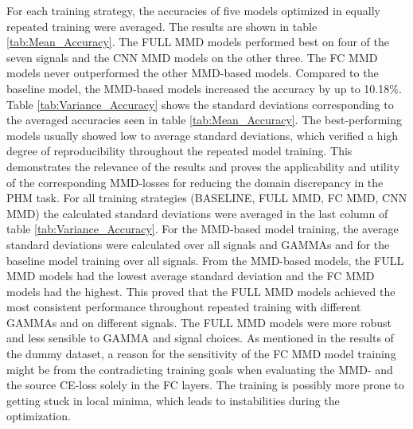 For each training strategy, the accuracies of five models optimized in equally repeated training were averaged. The results are shown in table \ref{tab:Mean_Accuracy}. The FULL MMD models performed best on four of the seven signals and the CNN MMD models on the other three. The FC MMD models never outperformed the other MMD-based models. Compared to the baseline model, the MMD-based models increased the accuracy by up to 10.18$\%$. Table \ref{tab:Variance_Accuracy} shows the standard deviations corresponding to the averaged accuracies seen in table \ref{tab:Mean_Accuracy}. The best-performing models usually showed low to average standard deviations, which verified a high degree of reproducibility throughout the repeated model training. This demonstrates the relevance of the results and proves the applicability and utility of the corresponding MMD-losses for reducing the domain discrepancy in the PHM task. For all training strategies (BASELINE, FULL MMD, FC MMD, CNN MMD) the calculated standard deviations were averaged in the last column of table \ref{tab:Variance_Accuracy}. For the MMD-based model training, the average standard deviations were calculated over all signals and GAMMAs and for the baseline model training over all signals. From the MMD-based models, the FULL MMD models had the lowest average standard deviation and the FC MMD models had the highest. This proved that the FULL MMD models achieved the most consistent performance throughout repeated training with different GAMMAs and on different signals. The FULL MMD models were more robust and less sensible to GAMMA and signal choices. As mentioned in the results of the dummy dataset, a reason for the sensitivity of the FC MMD model training might be from the contradicting training goals when evaluating the MMD- and the source CE-loss solely in the FC layers. The training is possibly more prone to getting stuck in local minima, which leads to instabilities during the optimization.
